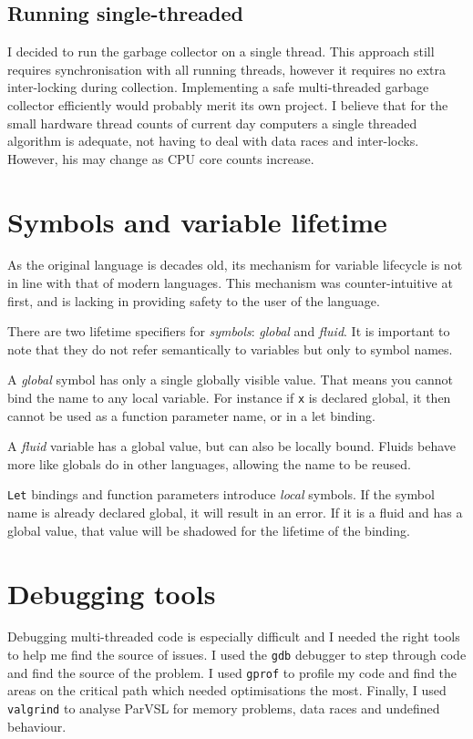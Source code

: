 \subsection{Running single-threaded}

I decided to run the garbage collector on a single thread. This approach still requires synchronisation with all running
threads, however it requires no extra inter-locking during collection. Implementing a safe multi-threaded garbage collector
efficiently would probably merit its own project. I believe that for the small hardware thread counts of current day computers
a single threaded algorithm is adequate, not having to deal with data races and inter-locks. However, his may change as
CPU core counts increase.

\section{Symbols and variable lifetime}
As the original language is decades old, its mechanism for variable lifecycle is not in line with that of modern languages.
This mechanism was counter-intuitive at first, and is lacking in providing safety to the user of the language.

There are two lifetime specifiers for \emph{symbols}: \emph{global} and \emph{fluid}. It is important to note that they
do not refer semantically to variables but only to symbol names.

A \emph{global} symbol has only a single globally visible value. That means you cannot bind the name to any local
variable. For instance if \texttt{x} is declared global, it then cannot be used as a function parameter name, or in a
let binding.

A \emph{fluid} variable has a global value, but can also be locally bound. Fluids behave more like globals do
in other languages, allowing the name to be reused.

\texttt{Let} bindings and function parameters introduce \emph{local} symbols. If the symbol name is already declared global,
it will result in an error. If it is a fluid and has a global value, that value will be shadowed for the lifetime
of the binding.

\section{Debugging tools}

Debugging multi-threaded code is especially difficult and I
needed the right tools to help me find the source of issues. I used
the \verb|gdb| \cite{gdb} debugger to step through code and find the source
of the problem. I used \verb|gprof| \cite{gprof} to profile my code and find
the areas on the critical path which needed optimisations the most. Finally,
I used \verb|valgrind| \cite{valgrind} to analyse ParVSL for memory
problems, data races and undefined behaviour.

